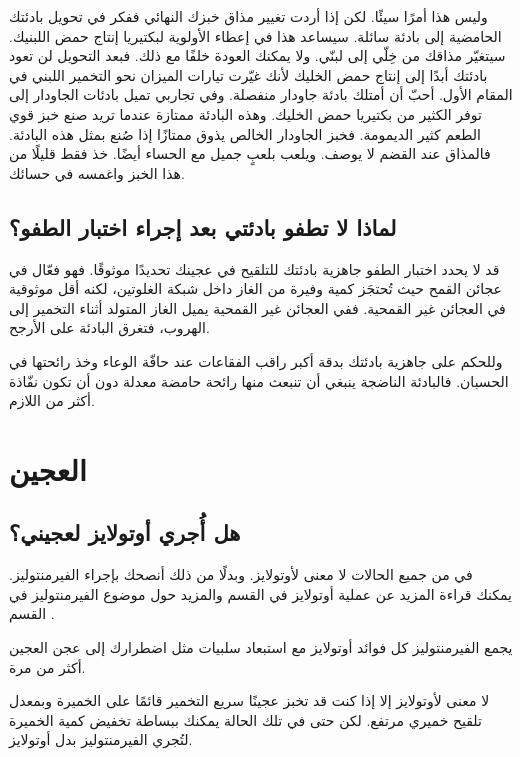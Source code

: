 وليس هذا أمرًا سيئًا. لكن إذا أردت تغيير مذاق خبزك النهائي ففكر في تحويل بادئتك الحامضية إلى بادئة سائلة. سيساعد هذا في إعطاء الأولوية لبكتيريا إنتاج حمض اللبنيك. سيتغيّر مذاقك من خِلّي إلى لبنّي. ولا يمكنك العودة خلفًا مع ذلك. فبعد التحويل لن تعود بادئتك أبدًا إلى إنتاج حمض الخليك لأنك غيّرت تيارات الميزان نحو التخمير اللبني في المقام الأول. أحبّ أن أمتلك بادئة جاودار منفصلة. وفي تجاربي تميل بادئات الجاودار إلى توفر الكثير من بكتيريا حمض الخليك. وهذه البادئة ممتازة عندما تريد صنع خبز قوي الطعم كثير الديمومة. فخبز الجاودار الخالص يذوق ممتازًا إذا صُنع بمثل هذه البادئة. فالمذاق عند القضم لا يوصف. ويلعب بلعبٍ جميل مع الحساء أيضًا. خذ فقط قليلًا من هذا الخبز واغمسه في حسائك.

\subsection{لماذا لا تطفو بادئتي بعد إجراء اختبار الطفو؟}

قد لا يحدد اختبار الطفو جاهزية بادئتك للتلقيح في عجينك تحديدًا موثوقًا. فهو فعّال في عجائن القمح حيث تُحتجَز كمية وفيرة من الغاز داخل شبكة الغلوتين، لكنه أقل موثوقية في العجائن غير القمحية. ففي العجائن غير القمحية يميل الغاز المتولد أثناء التخمير إلى الهروب، فتغرق البادئة على الأرجح.

وللحكم على جاهزية بادئتك بدقة أكبر راقب الفقاعات عند حافّة الوعاء وخذ رائحتها في الحسبان. فالبادئة الناضجة ينبغي أن تنبعث منها رائحة حامضة معدلة دون أن تكون نفّاذة أكثر من اللازم.

\section{العجين}

\subsection{هل أُجري أوتولايز لعجيني؟}

في  من جميع الحالات لا معنى لأوتولايز. وبدلًا من ذلك أنصحك بإجراء الفيرمنتوليز. يمكنك قراءة المزيد عن عملية أوتولايز في القسم  والمزيد حول موضوع الفيرمنتوليز في القسم .

يجمع الفيرمنتوليز كل فوائد أوتولايز مع استبعاد سلبيات مثل اضطرارك إلى عجن العجين أكثر من مرة.

لا معنى لأوتولايز إلا إذا كنت قد تخبز عجينًا سريع التخمير قائمًا على الخميرة وبمعدل تلقيح خميري مرتفع. لكن حتى في تلك الحالة يمكنك ببساطة تخفيض كمية الخميرة لتُجري الفيرمنتوليز بدل أوتولايز.

